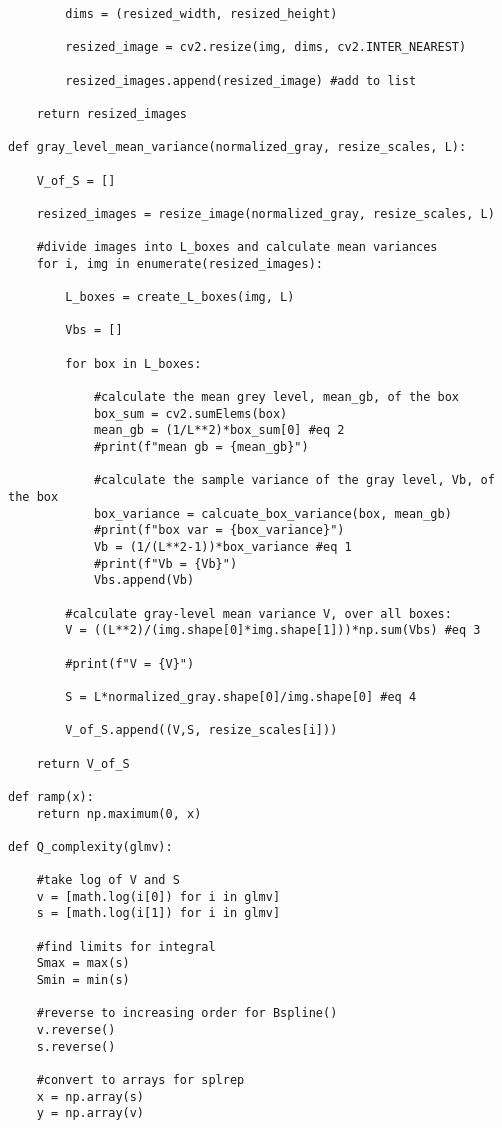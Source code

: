 \documentclass[12pt]{article}
\begin{document}
\begin{verbatim}
        dims = (resized_width, resized_height) 

        resized_image = cv2.resize(img, dims, cv2.INTER_NEAREST) 
        
        resized_images.append(resized_image) #add to list
    
    return resized_images

def gray_level_mean_variance(normalized_gray, resize_scales, L):

    V_of_S = []

    resized_images = resize_image(normalized_gray, resize_scales, L)

    #divide images into L_boxes and calculate mean variances
    for i, img in enumerate(resized_images): 

        L_boxes = create_L_boxes(img, L) 

        Vbs = []

        for box in L_boxes:

            #calculate the mean grey level, mean_gb, of the box
            box_sum = cv2.sumElems(box)
            mean_gb = (1/L**2)*box_sum[0] #eq 2
            #print(f"mean gb = {mean_gb}")

            #calculate the sample variance of the gray level, Vb, of the box
            box_variance = calcuate_box_variance(box, mean_gb)
            #print(f"box var = {box_variance}")
            Vb = (1/(L**2-1))*box_variance #eq 1
            #print(f"Vb = {Vb}")
            Vbs.append(Vb)

        #calculate gray-level mean variance V, over all boxes:
        V = ((L**2)/(img.shape[0]*img.shape[1]))*np.sum(Vbs) #eq 3

        #print(f"V = {V}")

        S = L*normalized_gray.shape[0]/img.shape[0] #eq 4

        V_of_S.append((V,S, resize_scales[i])) 

    return V_of_S

def ramp(x):
    return np.maximum(0, x)

def Q_complexity(glmv):

    #take log of V and S
    v = [math.log(i[0]) for i in glmv]
    s = [math.log(i[1]) for i in glmv]

    #find limits for integral
    Smax = max(s)
    Smin = min(s)

    #reverse to increasing order for Bspline()
    v.reverse()
    s.reverse() 

    #convert to arrays for splrep
    x = np.array(s)
    y = np.array(v)


\end{verbatim}
\end{document}
